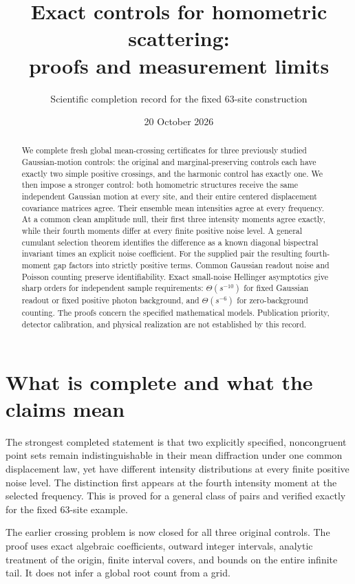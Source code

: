 \documentclass[11pt]{article}
\title{Exact controls for homometric scattering:\\proofs and measurement limits}
\author{Scientific completion record for the fixed 63-site construction}
\date{20 October 2026}
\begin{document}
\maketitle

\begin{abstract}
We complete fresh global mean-crossing certificates for three previously
studied Gaussian-motion controls: the original and marginal-preserving
controls each have exactly two simple positive crossings, and the harmonic
control has exactly one. We then impose a stronger control: both homometric
structures receive the same independent Gaussian motion at every site, and
their entire centered displacement covariance matrices agree. Their ensemble
mean intensities agree at every frequency. At a common clean amplitude null,
their first three intensity moments agree exactly, while their fourth moments
differ at every finite positive noise level. A general cumulant selection
theorem identifies the difference as a known diagonal bispectral invariant
times an explicit noise coefficient. For the supplied pair the resulting
fourth-moment gap factors into strictly positive terms. Common Gaussian readout noise and
Poisson counting preserve identifiability. Exact small-noise Hellinger
asymptotics give sharp orders for independent sample requirements:
$\Theta(s^{-10})$ for fixed Gaussian readout or fixed positive photon
background, and $\Theta(s^{-6})$ for zero-background counting. The proofs
concern the specified mathematical models. Publication priority, detector
calibration, and physical realization are not established by this record.
\end{abstract}

\tableofcontents
\clearpage

\section{What is complete and what the claims mean}

The strongest completed statement is that two explicitly specified,
noncongruent point sets remain indistinguishable in their mean diffraction
under one common displacement law, yet have different intensity distributions
at every finite positive noise level. The distinction first appears at the
fourth intensity moment at the selected frequency. This is proved for a
general class of pairs and verified exactly for the fixed 63-site example.

The earlier crossing problem is now closed for all three original controls.
The proof uses exact algebraic coefficients, outward integer intervals,
analytic treatment of the origin, finite interval covers, and bounds on the
entire infinite tail. It does not infer a global root count from a grid.
\end{document}

